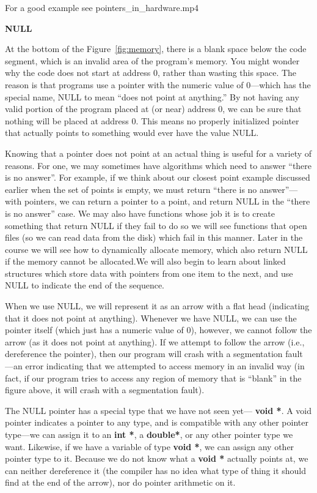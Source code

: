 \documentclass[11pt, a4paper]{article}
\begin{document}
For a good example see pointers\_in\_hardware.mp4

\textbf{NULL}

At the bottom of the Figure~\ref{fig:memory}, there is a blank space below the code segment, which is an invalid area of the program’s memory. You might wonder why the code does not start at address 0, rather than wasting this space. The reason is that programs use a pointer with the numeric value of 0—which has the special name, NULL to mean “does not point at anything.” By not having any valid portion of the program placed at (or near) address 0, we can be sure that nothing will be placed at address 0. This means no properly initialized pointer that actually points to something would ever have the value NULL.


Knowing that a pointer does not point at an actual thing is useful for a variety of reasons. For one, we may sometimes have algorithms which need to answer “there is no answer”. For example, if we think about our closest point example discussed earlier when the set of points is empty, we must return “there is no answer”—with pointers, we can return a pointer to a point, and return NULL in the “there is no answer” case. We may also have functions whose job it is to create something that return NULL if they fail to do so we will see functions that open files (so we can read data from the disk) which fail in this manner. Later in the course we will see how to dynamically allocate memory, which also return NULL if the memory cannot be allocated.We will also begin to learn about linked structures which store data with pointers from one item to the next, and use NULL to indicate the end of the sequence.

When we use NULL, we will represent it as an arrow with a flat head (indicating that it does not point at anything). Whenever we have NULL, we can use the pointer itself (which just has a numeric value of 0), however, we cannot follow the arrow (as it does not point at anything). If we attempt to follow the arrow (i.e., dereference the pointer), then our program will crash with a segmentation fault —an error indicating that we attempted to access memory in an invalid way (in fact, if our program tries to access any region of memory that is “blank” in the figure above, it will crash with a segmentation fault).


The NULL pointer has a special type that we have not seen yet— \textbf{void *}. A void pointer indicates a pointer to any type, and is compatible with any other pointer type—we can assign it to an \textbf{int *}, a \textbf{double*}, or any other pointer type we want. Likewise, if we have a variable of type \textbf{void *}, we can assign any other pointer type to it. Because we do not know what a \textbf{void *} actually points at, we can neither dereference it (the compiler has no idea what type of thing it should find at the end of the arrow), nor do pointer arithmetic on it.
\end{document}
